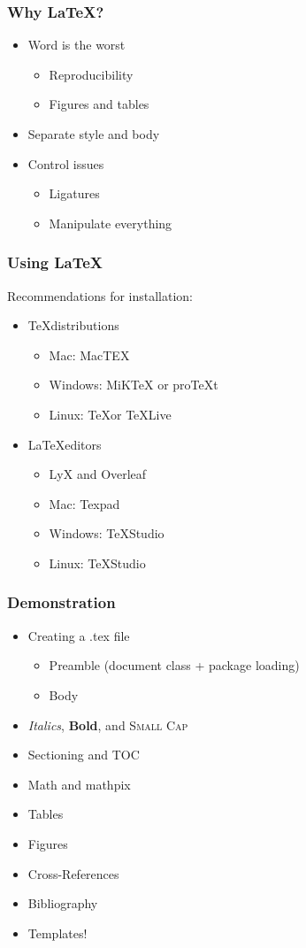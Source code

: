 \documentclass{beamer}
\begin{document}
		\begin{frame}
			\frametitle{Why \LaTeX?}
\begin{itemize}[<+->]
		\item Word is the worst
		\begin{itemize}
		\item Reproducibility
		\item Figures and tables
		\end{itemize}
		\item Separate style and body
		\item Control issues
		\begin{itemize}
		\item Ligatures
		\item Manipulate everything
		\end{itemize}
\end{itemize}
		\end{frame}
\begin{frame}
\frametitle{Using \LaTeX}
Recommendations for installation:
\begin{itemize}[<+->]
	\item \TeX distributions
	\begin{itemize} \item Mac: MacTEX
	\item Windows: MiKTeX or proTeXt
	\item Linux: \TeX  or TeXLive \end{itemize}
	\item \LaTeX editors
	\begin{itemize}
	\item LyX and Overleaf
	\item Mac: Texpad
	\item Windows: TeXStudio 
	\item Linux: TeXStudio
	\end{itemize}
	\end{itemize}
\end{frame}
\begin{frame}
\frametitle{Demonstration}
\begin{itemize}[<+->]
	\item{Creating a .tex file}
	\begin{itemize}
		\item Preamble (document class + package loading)
		\item Body
	\end{itemize}
\item \emph{Italics}, \textbf{Bold}, and \textsc{Small Cap}
\item{Sectioning and TOC}
\item{Math and mathpix}
\item Tables
\item Figures
\item Cross-References
\item Bibliography
\item Templates!
\end{itemize}
\end{frame}
\end{document}

